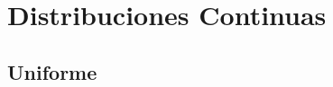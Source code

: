 \documentclass[12pt, fleqn]{report}                             %
\theoremstyle{break}                                            %
\begin{document}
        \clearpage
        \section{Distribuciones Continuas}


            \subsection{Uniforme}
\end{document}
